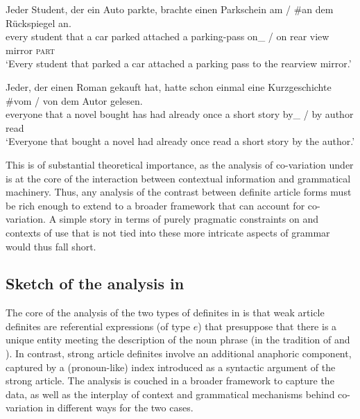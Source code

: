 \documentclass[output=paper
,modfonts
,nonflat]{langscibook}
\begin{document}
\begin{exe}
\ex {}
\begin{xlist}
\ex \gll Jeder Student, der {ein} {Auto} parkte, brachte einen Parkschein {am} \textnormal{/} \textnormal{\#}an {dem} {R\"uckspiegel} an.\\
every student that a car parked attached a {parking-pass} {on\_\theweak} / {\phantom{\#}}on {\thestrong} {rear view mirror} \textsc{part}\\
\glt `Every student that parked a car attached a parking pass to the rearview mirror.'

\ex\gll Jeder, der {einen} {Roman} gekauft hat, hatte schon einmal eine Kurzgeschichte \textnormal{\#}vom \textnormal{/} {von} {dem} {Autor} gelesen.\label{author}\\
everyone that a novel bought has had already once a {short story} {\phantom{\#}}{by\_\theweak} / by {\thestrong} author read\\
\glt `Everyone that bought a novel had already once read a short story
by the author.'
\end{xlist}
\end{exe}

This is of substantial theoretical importance, as the analysis of
co-variation under  is at the core of the interaction
between contextual information and grammatical machinery. Thus, any
analysis of the contrast between definite article forms must be rich
enough to extend to a broader framework that can account for
co-variation. A simple story in terms of purely pragmatic constraints on
 and contexts of use that is not tied into these more intricate aspects of
grammar would thus fall short.


\subsection{Sketch of the analysis in \citet{Schwarz2009}}

The core of the analysis of the two types of definites in
\citet{Schwarz2009} is that weak article definites are referential
expressions (of type $e$) that presuppose that there is a unique
entity meeting the description of the noun phrase (in the tradition of
\citeauthor{Frege1892} and \citeauthor{Strawson1950}). In contrast, strong article definites involve an
additional anaphoric component, captured by a (pronoun-like) index
introduced as
a syntactic argument of the strong article. The analysis
is couched in a broader framework to capture the  data, as well
as the interplay of context
and grammatical mechanisms behind co-variation in different ways for
the two cases. 
\end{document}
